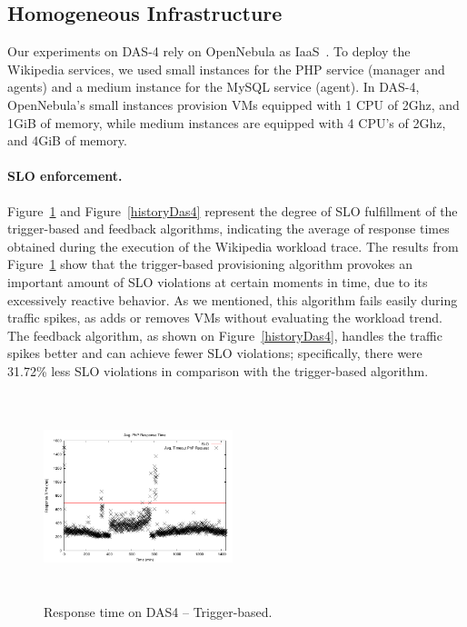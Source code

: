 
\subsection*{Homogeneous Infrastructure}

Our experiments on DAS-4 rely on OpenNebula as IaaS~\cite{sotomayor_virtual_2009}. To deploy the Wikipedia services, we used small instances for the PHP service (manager and agents) and a medium instance for the MySQL service (agent). In DAS-4, OpenNebula's small instances provision VMs equipped with 1 CPU of 2Ghz, and 1GiB of memory, while medium instances are equipped with 4 CPU's of 2Ghz, and 4GiB of memory.

\paragraph{SLO enforcement.}
Figure~\ref{naiveDas4} and Figure~\ref{historyDas4} represent the degree of SLO fulfillment of the trigger-based and feedback algorithms, indicating the average of response times obtained during the execution of the Wikipedia workload trace. The results from Figure~\ref{naiveDas4} show that the trigger-based provisioning algorithm provokes an important amount of SLO violations at certain moments in time, due to its excessively reactive behavior. As we mentioned, this algorithm fails easily during traffic spikes, as adds or removes VMs without evaluating the workload trend. The feedback algorithm, as shown on Figure~\ref{historyDas4}, handles the traffic spikes better and can achieve fewer SLO violations; specifically, there were 31.72\% less SLO violations in comparison with the trigger-based algorithm. 


\begin{figure}

\begin{center}
\includegraphics[width=0.49\textwidth, height=6cm]{./images/homogeneous/avgTimeout_PhP_trigger}
\end{center}
\vspace{-5mm}
\caption{Response time on DAS4 -- Trigger-based.}
\label{naiveDas4}
\end{figure}

